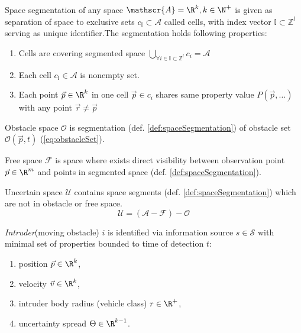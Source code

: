     \begin{definition}{Space segmentation}\label{def:spaceSegmentation} of any space $\mathscr{A}=\R^k, k\in\N^+$ is given as separation of space to exclusive sets $c_\mathbb{I}\subset\mathscr{A}$ called cells, with index vector $\mathbb{I}\subset\mathbb{Z}^l$ serving as unique identifier.The segmentation holds following properties:
    \begin{enumerate}
        \item Cells are covering segmented space $\bigcup_{\forall i\in \mathbb{I}\subset\mathbb{Z}^l} c_i = \mathscr{A}$
        \item Each cell $c_\mathbb{I}\in\mathscr{A}$ is nonempty set.
        \item Each point $\vec{p}\in\R^k$ in one cell $\vec{p}\in c_i$ shares same property value $P(\vec{p},\dots)$ with any point $\vec{r}\neq\vec{p}$ 
    \end{enumerate}
    
    \end{definition}
    
    \begin{definition}{Obstacle space $\mathscr{O}$} is segmentation (def. \ref{def:spaceSegmentation}) of obstacle set $\mathscr{O}(\vec{p},t)$ (\ref{eq:obstacleSet}).
    \end{definition}
    
    \begin{definition}{Free space $\mathscr{F}$} is space where exists direct visibility between observation point $\vec{p}\in\R^m$ and points in segmented space (def. \ref{def:spaceSegmentation}).
    \end{definition}
    
    \begin{definition}{Uncertain space $\mathscr{U}$} contains space segments (def. \ref{def:spaceSegmentation}) which are not in obstacle or free space.
    \begin{equation}
        \mathscr{U}=(\mathscr{A}-\mathscr{F})-\mathscr{O}
    \end{equation}
    \end{definition}
    
    \begin{definition}{\emph{Intruder}(moving obstacle) $i$} is identified via information source $s\in\mathscr{S}$ with minimal set of properties bounded to time of detection $t$:
    \begin{enumerate}
        \item position $\vec{p}\in\R^k$,
        \item velocity $\vec{v}\in\R^k$,
        \item intruder body radius (vehicle class) $r\in\R^+$,
        \item uncertainty spread $\Theta\in\R^{k-1}$.
    \end{enumerate}
    
    \end{definition}

